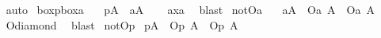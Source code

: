 \begin{isabellebody}
%
\isadelimproof
\ \ %
\endisadelimproof
%
\isatagproof
{}\isamarkupfalse%
\ auto%
\endisatagproof
{\isafoldproof}%
%
\isadelimproof
\isanewline
%
\endisadelimproof
{}\isamarkupfalse%
\ boxp{\isacharunderscore}boxa{\isacharcolon}\isanewline
\ \ \ {\isachardoublequoteopen}{\isasymTurnstile}{\isacharparenleft}{\isacharparenleft}{\isasymbox}\isactrlsub pA{\isacharparenright}\ \isactrlbold {\isasymrightarrow}\ {\isacharparenleft}{\isasymbox}\isactrlsub aA{\isacharparenright}{\isacharparenright}{\isachardoublequoteclose}\isanewline
%
\isadelimproof
\ \ %
\endisadelimproof
%
\isatagproof
{}\isamarkupfalse%
\ ax{\isacharunderscore}{}a\ \isamarkupfalse%
\ blast\isanewline
\isanewline
%
%
\endisatagproof
{\isafoldproof}%
%
\isadelimproof
\isanewline
%
\endisadelimproof
{}\isamarkupfalse%
\ not{\isacharunderscore}Oa{\isacharcolon}\isanewline
\ \ \ {\isachardoublequoteopen}{\isasymTurnstile}{\isacharparenleft}{\isacharparenleft}{\isasymbox}\isactrlsub aA{\isacharparenright}\ \isactrlbold {\isasymrightarrow}\ {\isacharparenleft}{\isacharparenleft}\isactrlbold {\isasymnot}{\isacharparenleft}O\isactrlsub a\ A{\isacharparenright}{\isacharparenright}\ \isactrlbold {\isasymand}\ {\isacharparenleft}\isactrlbold {\isasymnot}{\isacharparenleft}O\isactrlsub a\ {\isacharparenleft}\isactrlbold {\isasymnot}A{\isacharparenright}{\isacharparenright}{\isacharparenright}{\isacharparenright}{\isacharparenright}{\isachardoublequoteclose}\isanewline
%
\isadelimproof
\ \ %
\endisadelimproof
%
\isatagproof
{}\isamarkupfalse%
\ O{\isacharunderscore}diamond\ \isamarkupfalse%
\ blast%
\endisatagproof
{\isafoldproof}%
%
\isadelimproof
\isanewline
%
\endisadelimproof
{}\isamarkupfalse%
\ not{\isacharunderscore}Op{\isacharcolon}\isanewline
{}\ {\isachardoublequoteopen}{\isasymTurnstile}{\isacharparenleft}{\isacharparenleft}{\isasymbox}\isactrlsub pA{\isacharparenright}\ \isactrlbold {\isasymrightarrow}\ {\isacharparenleft}{\isacharparenleft}\isactrlbold {\isasymnot}{\isacharparenleft}O\isactrlsub p\ A{\isacharparenright}{\isacharparenright}\ \isactrlbold {\isasymand}\ {\isacharparenleft}\isactrlbold {\isasymnot}{\isacharparenleft}O\isactrlsub p\ {\isacharparenleft}\isactrlbold {\isasymnot}A{\isacharparenright}{\isacharparenright}{\isacharparenright}{\isacharparenright}{\isacharparenright}{\isachardoublequoteclose}\isanewline
%
\isadelimproof
\ \ %

\end{isabellebody}
